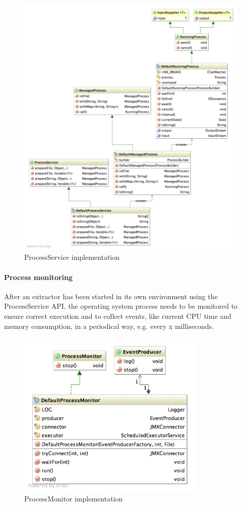 \begin{figure}[H]
\centering
\includegraphics[width=\textwidth, trim=20px 20px 0 0, clip=true]{process.png}
\caption{ProcessService implementation}
\label{fig:process}
\end{figure}

\newpage
\paragraph{Process monitoring}
After an extractor has been started in its own environment using the ProcessService API, the operating system process needs to be monitored to ensure correct execution and to collect events, like current CPU time and memory consumption, in a periodical way, e.g. every x milliseconds.

\begin{figure}[H]
\centering
\includegraphics[width=0.8\textwidth, trim=20px 20px 0 0, clip=true]{monitor.png}
\caption{ProcessMonitor implementation}
\end{figure}

